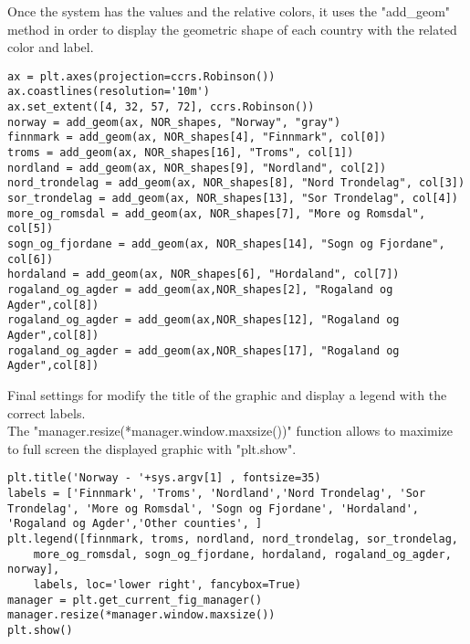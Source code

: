 Once the system has the values and the relative colors, it uses the "add\_geom" method in order to display the geometric shape of each country with the related color and label. 
\begin{lstlisting}
ax = plt.axes(projection=ccrs.Robinson())
ax.coastlines(resolution='10m')
ax.set_extent([4, 32, 57, 72], ccrs.Robinson())	
norway = add_geom(ax, NOR_shapes, "Norway", "gray")
finnmark = add_geom(ax, NOR_shapes[4], "Finnmark", col[0])
troms = add_geom(ax, NOR_shapes[16], "Troms", col[1])
nordland = add_geom(ax, NOR_shapes[9], "Nordland", col[2])
nord_trondelag = add_geom(ax, NOR_shapes[8], "Nord Trondelag", col[3])
sor_trondelag = add_geom(ax, NOR_shapes[13], "Sor Trondelag", col[4])
more_og_romsdal = add_geom(ax, NOR_shapes[7], "More og Romsdal", col[5])
sogn_og_fjordane = add_geom(ax, NOR_shapes[14], "Sogn og Fjordane", col[6])
hordaland = add_geom(ax, NOR_shapes[6], "Hordaland", col[7])
rogaland_og_agder = add_geom(ax,NOR_shapes[2], "Rogaland og Agder",col[8])
rogaland_og_agder = add_geom(ax,NOR_shapes[12], "Rogaland og Agder",col[8])
rogaland_og_agder = add_geom(ax,NOR_shapes[17], "Rogaland og Agder",col[8])
\end{lstlisting}

Final settings for modify the title of the graphic and display a legend with the correct labels. \\
The "manager.resize(*manager.window.maxsize())" function allows to maximize to full screen the displayed graphic with "plt.show".
\begin{lstlisting}
plt.title('Norway - '+sys.argv[1] , fontsize=35)
labels = ['Finnmark', 'Troms', 'Nordland','Nord Trondelag', 'Sor Trondelag', 'More og Romsdal',	'Sogn og Fjordane', 'Hordaland', 	'Rogaland og Agder','Other counties', ]
plt.legend([finnmark, troms, nordland, nord_trondelag, sor_trondelag, 
	more_og_romsdal, sogn_og_fjordane, hordaland, rogaland_og_agder, norway], 
	labels, loc='lower right', fancybox=True)
manager = plt.get_current_fig_manager()
manager.resize(*manager.window.maxsize())
plt.show()


\end{lstlisting}